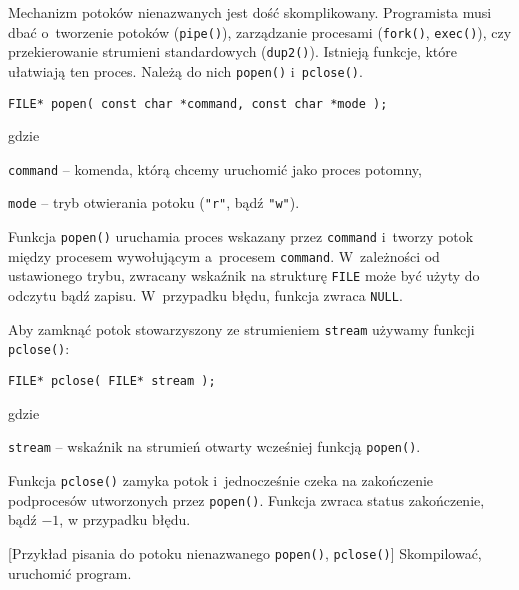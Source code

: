 Mechanizm potoków nienazwanych jest dość skomplikowany. Programista musi dbać
o~tworzenie potoków (\texttt{pipe()}), zarządzanie procesami (\texttt{fork()},
\texttt{exec()}), czy przekierowanie strumieni standardowych (\texttt{dup2()}).
Istnieją funkcje, które ułatwiają ten proces. Należą do nich \texttt{popen()}
i~\texttt{pclose()}.
\begin{lstlisting}[style=MyCStyle]
FILE* popen( const char *command, const char *mode );
\end{lstlisting}
gdzie
\begin{myitemize}
  \item \texttt{command} -- komenda, którą chcemy uruchomić jako proces potomny,
  \item \texttt{mode} -- tryb otwierania potoku (\texttt{"r"}, bądź \texttt{"w"}).
\end{myitemize}
Funkcja \texttt{popen()} uruchamia proces wskazany przez \texttt{command}
i~tworzy potok między procesem wywołującym a~procesem \texttt{command}.
W~zależności od ustawionego trybu, zwracany wskaźnik na strukturę \texttt{FILE}
może być użyty do odczytu bądź zapisu. W~przypadku błędu, funkcja zwraca
\texttt{NULL}.

Aby zamknąć potok stowarzyszony ze strumieniem \texttt{stream} używamy funkcji
\texttt{pclose()}:
\begin{lstlisting}[style=MyCStyle]
FILE* pclose( FILE* stream );
\end{lstlisting}
gdzie
\begin{myitemize}
  \item \texttt{stream} -- wskaźnik na strumień otwarty wcześniej funkcją \texttt{popen()}.
\end{myitemize}
Funkcja \texttt{pclose()} zamyka potok i~jednocześnie czeka na zakończenie
podprocesów utworzonych przez \texttt{popen()}. Funkcja zwraca status
zakończenie, bądź $-1$, w przypadku błędu.

\begin{example}{[Przykład pisania do potoku nienazwanego \texttt{popen()}, \texttt{pclose()}]}
  Skompilować, uruchomić program.
  
\end{example}

